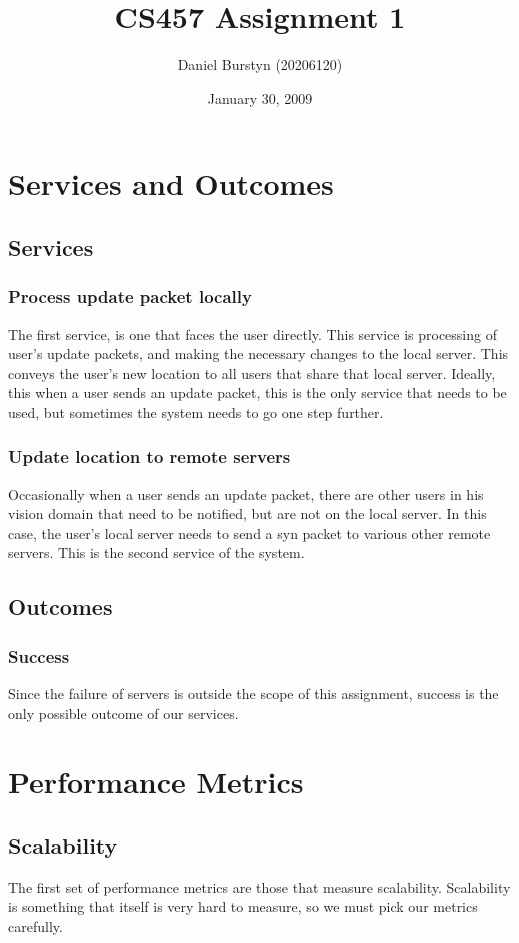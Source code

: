 \documentclass[12pt]{article}
\title{CS457 Assignment 1}
\author{Daniel Burstyn (20206120)}
\date{January 30, 2009}
\begin{document}
\maketitle
\tableofcontents
\doublespace
\newpage
\addtocounter{section}{1} %
\section{Services and Outcomes}
  \subsection{Services}
    \subsubsection{Process update packet locally}
The first service, is one that faces the user directly.  This service is
processing of user's update packets, and making the necessary changes to the
local server.  This conveys the user's new location to all users that share that
local server.  Ideally, this when a user sends an update packet, this is the
only service that needs to be used, but sometimes the system needs to go one
step further.
    \subsubsection{Update location to remote servers}
Occasionally when a user sends an update packet, there are other users in his
vision domain that need to be notified, but are not on the local server.  In
this case, the user's local server needs to send a syn packet to various other
remote servers.  This is the second service of the system.
  \subsection{Outcomes}
    \subsubsection{Success}
Since the failure of servers is outside the scope of this assignment, success
is the only possible outcome of our services.
\section{Performance Metrics}
  \subsection{Scalability}
The first set of performance metrics are those that measure scalability.
Scalability is something that itself is very hard to measure, so we must pick
our metrics carefully.
\end{document}
